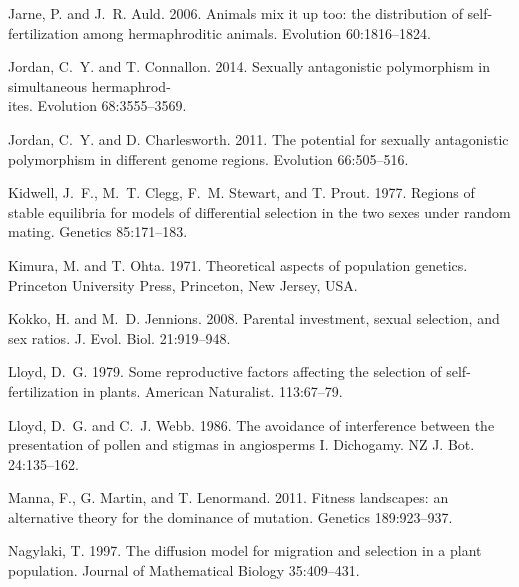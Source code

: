 \documentclass{article}
\begin{document}
\begin{thebibliography}{}
Jarne, P. and J.~R. Auld. 2006.
\newblock Animals mix it up too: the distribution of self-fertilization among hermaphroditic animals.
\newblock Evolution 60:1816--1824.

Jordan, C.~Y. and T. Connallon. 2014.
\newblock Sexually antagonistic polymorphism in simultaneous hermaphrod-\\ites.
\newblock Evolution 68:3555--3569.

Jordan, C.~Y. and D. Charlesworth. 2011.
\newblock The potential for sexually antagonistic polymorphism in different genome regions.
\newblock Evolution 66:505--516.

Kidwell, J.~F., M.~T. Clegg, F.~M. Stewart, and T. Prout. 1977.
\newblock Regions of stable equilibria for models of differential selection in the two sexes under random mating.
\newblock Genetics 85:171--183.

Kimura, M. and T. Ohta. 1971.
\newblock Theoretical aspects of population genetics.
\newblock Princeton University Press, Princeton, New Jersey, USA.

Kokko, H. and M.~D. Jennions. 2008.
\newblock Parental investment, sexual selection, and sex ratios.
\newblock J. Evol. Biol. 21:919--948.

Lloyd, D.~G. 1979.
\newblock Some reproductive factors affecting the selection of self-fertilization in plants.
\newblock American Naturalist. 113:67--79.

Lloyd, D.~G. and C.~J. Webb. 1986.
\newblock The avoidance of interference between the presentation of pollen and stigmas in angiosperms I. Dichogamy.
\newblock NZ J. Bot. 24:135--162.

Manna, F., G. Martin, and T. Lenormand. 2011.
\newblock Fitness landscapes: an alternative theory for the dominance of mutation.
\newblock Genetics 189:923--937.

Nagylaki, T. 1997.
\newblock The diffusion model for migration and selection in a plant population.
\newblock Journal of Mathematical Biology 35:409--431.


\end{thebibliography}
\end{document}
